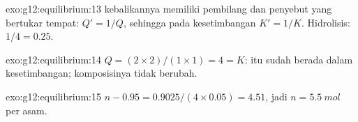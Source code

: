 \begin{solution}{exo:g12:equilibrium:13}
 kebalikannya memiliki pembilang dan penyebut yang
bertukar tempat: $Q' = 1/Q$, sehingga pada kesetimbangan $K' = 1/K$.
Hidrolisis: $1/4 = 0.25$.
\end{solution}

\begin{solution}{exo:g12:equilibrium:14}
$Q = (2 \times 2)/(1 \times 1) = 4 = K$:  itu sudah berada dalam
kesetimbangan; komposisinya tidak berubah.
\end{solution}

\begin{solution}{exo:g12:equilibrium:15}
$n - 0.95 = 0.9025 / (4 \times 0.05) = 4.51$, jadi $n = \qty{5.5}{mol}$
 per  asam.
\end{solution}

